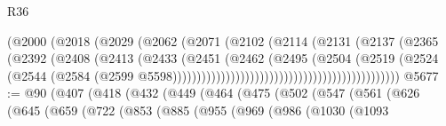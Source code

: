 \begin{lexlean}{R36}
\begin{coremodule}
                                                    (@2000
                                                      (@2018
                                                        (@2029
                                                          (@2062
                                                            (@2071
                                                              (@2102
                                                                (@2114
                                                                  (@2131
                                                                    (@2137
                                                                      (@2365
                                                                        (@2392
                                                                          (@2408
                                                                            (@2413
                                                                              (@2433
                                                                                (@2451
                                                                                  (@2462
                                                                                    (@2495
                                                                                      (@2504
                                                                                        (@2519
                                                                                          (@2524
                                                                                            (@2544
                                                                                              (@2584
                                                                                                (@2599
                                                                                                  @5598)))))))))))))))))))))))))))))))))))))))))))))))
@5677 := @90
    (@407
      (@418
        (@432
          (@449
            (@464
              (@475
                (@502
                  (@547
                    (@561
                      (@626
                        (@645
                          (@659
                            (@722
                              (@853
                                (@885
                                  (@955
                                    (@969
                                      (@986
                                        (@1030
                                          (@1093

\end{coremodule}
\end{lexlean}
